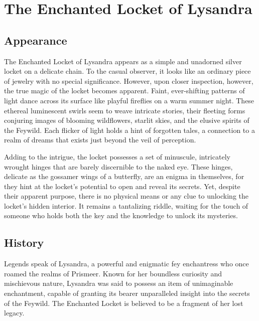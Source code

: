 
\chapter*{The Enchanted Locket of Lysandra}

\section*{Appearance}
The Enchanted Locket of Lysandra appears as a simple and unadorned silver locket on a delicate chain. To the casual observer, it looks like an ordinary piece of jewelry with no special significance. However, upon closer inspection, however, the true magic of the locket becomes apparent. Faint, ever-shifting patterns of light dance across its surface like playful fireflies on a warm summer night. These ethereal luminescent swirls seem to weave intricate stories, their fleeting forms conjuring images of blooming wildflowers, starlit skies, and the elusive spirits of the Feywild. Each flicker of light holds a hint of forgotten tales, a connection to a realm of dreams that exists just beyond the veil of perception.

Adding to the intrigue, the locket possesses a set of minuscule, intricately wrought hinges that are barely discernible to the naked eye. These hinges, delicate as the gossamer wings of a butterfly, are an enigma in themselves, for they hint at the locket's potential to open and reveal its secrets. Yet, despite their apparent purpose, there is no physical means or any clue to unlocking the locket's hidden interior. It remains a tantalizing riddle, waiting for the touch of someone who holds both the key and the knowledge to unlock its mysteries.
\eject
\section*{History}
Legends speak of Lysandra, a powerful and enigmatic fey enchantress who once roamed the realms of Prismeer. Known for her boundless curiosity and mischievous nature, Lysandra was said to possess an item of unimaginable enchantment, capable of granting its bearer unparalleled insight into the secrets of the Feywild. The Enchanted Locket is believed to be a fragment of her lost legacy.
\vspace*{-1.2\fontdimen6\font}
